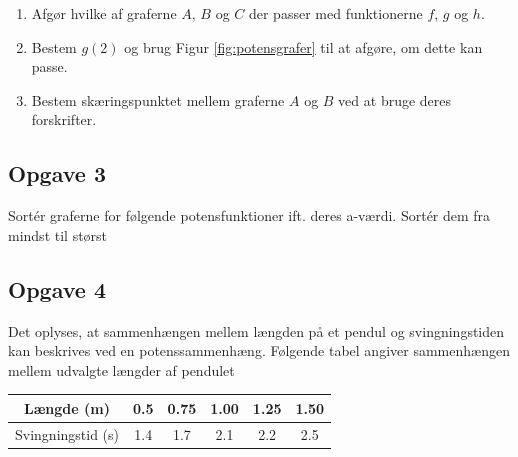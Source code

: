 \begin{enumerate}[label=\roman*)]
	\item Afgør hvilke af graferne $A$, $B$ og $C$ der passer med funktionerne $f$, $g$ og $h$.
	\item Bestem $g(2)$ og brug Figur \ref{fig:potensgrafer} til at afgøre, om dette kan passe.
	\item Bestem skæringspunktet mellem graferne $A$ og $B$ ved at bruge deres forskrifter.
\end{enumerate}

\subsection*{Opgave 3}

Sortér graferne for følgende potensfunktioner ift. deres a-værdi. Sortér dem fra mindst til størst

\begin{center}
\end{center}



\subsection*{Opgave 4}

Det oplyses, at sammenhængen mellem længden på et pendul og svingningstiden kan beskrives ved en potenssammenhæng. Følgende tabel angiver sammenhængen mellem udvalgte længder af pendulet

\begin{center}\begin{tabular}{c|c|c|c|c|c}
Længde (m)& 0.5 & 0.75 & 1.00 & 1.25 & 1.50\\ \hline
Svingningstid (s) & 1.4 & 1.7 & 2.1 & 2.2 & 2.5 
\end{tabular}
\end{center}

